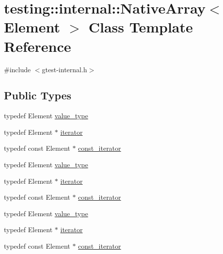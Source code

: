 \hypertarget{classtesting_1_1internal_1_1_native_array}{}\section{testing\+::internal\+::Native\+Array$<$ Element $>$ Class Template Reference}
\label{classtesting_1_1internal_1_1_native_array}


{\ttfamily \#include $<$gtest-\/internal.\+h$>$}

\subsection*{Public Types}
\begin{DoxyCompactItemize}
\item 
typedef Element \mbox{\hyperlink{classtesting_1_1internal_1_1_native_array_a12216d686e16e4cc63d952fada5b2ba9}{value\+\_\+type}}
\item 
typedef Element $\ast$ \mbox{\hyperlink{classtesting_1_1internal_1_1_native_array_ac1301a57977b57a1ad013e4e25fc2a72}{iterator}}
\item 
typedef const Element $\ast$ \mbox{\hyperlink{classtesting_1_1internal_1_1_native_array_a9ce7c8408460d7158a2870456d134557}{const\+\_\+iterator}}
\item 
typedef Element \mbox{\hyperlink{classtesting_1_1internal_1_1_native_array_a12216d686e16e4cc63d952fada5b2ba9}{value\+\_\+type}}
\item 
typedef Element $\ast$ \mbox{\hyperlink{classtesting_1_1internal_1_1_native_array_ac1301a57977b57a1ad013e4e25fc2a72}{iterator}}
\item 
typedef const Element $\ast$ \mbox{\hyperlink{classtesting_1_1internal_1_1_native_array_a9ce7c8408460d7158a2870456d134557}{const\+\_\+iterator}}
\item 
typedef Element \mbox{\hyperlink{classtesting_1_1internal_1_1_native_array_a12216d686e16e4cc63d952fada5b2ba9}{value\+\_\+type}}
\item 
typedef Element $\ast$ \mbox{\hyperlink{classtesting_1_1internal_1_1_native_array_ac1301a57977b57a1ad013e4e25fc2a72}{iterator}}
\item 
typedef const Element $\ast$ \mbox{\hyperlink{classtesting_1_1internal_1_1_native_array_a9ce7c8408460d7158a2870456d134557}{const\+\_\+iterator}}
\end{DoxyCompactItemize}
